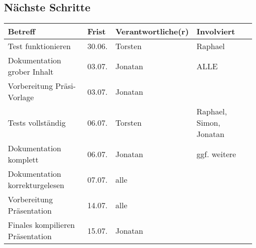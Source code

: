 \documentclass{scrartcl}
\begin{document}
\subsection{Nächste Schritte}
\begin{tabular}{L{.249} L{.2} L{.25} L{.25}}
Betreff & Frist & Verantwortliche(r) & Involviert\\\hline
Test funktionieren & 30.06.	& Torsten & Raphael\\
Dokumentation grober Inhalt & 03.07. & Jonatan & ALLE\\
Vorbereitung Präsi-Vorlage & 03.07. & Jonatan \\
Tests vollständig & 06.07. & Torsten & Raphael, Simon, Jonatan\\
Dokumentation komplett & 06.07. & Jonatan & ggf. weitere\\
Dokumentation korrekturgelesen & 07.07. & alle & \\
Vorbereitung Präsentation & 14.07. & alle \\
Finales kompilieren Präsentation & 15.07. & Jonatan \\
\end{tabular}
\end{document}
